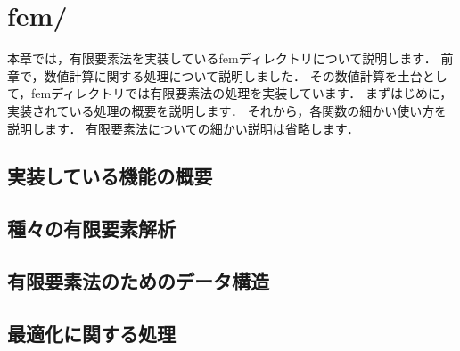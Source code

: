 \chapter{fem/} \label{chap:fem}

本章では，有限要素法を実装しているfemディレクトリについて説明します．
前章で，数値計算に関する処理について説明しました．
その数値計算を土台として，femディレクトリでは有限要素法の処理を実装しています．
まずはじめに，実装されている処理の概要を説明します．
それから，各関数の細かい使い方を説明します．
有限要素法についての細かい説明は省略します．

\section{実装している機能の概要}

\section{種々の有限要素解析}

\section{有限要素法のためのデータ構造}

\section{最適化に関する処理}


